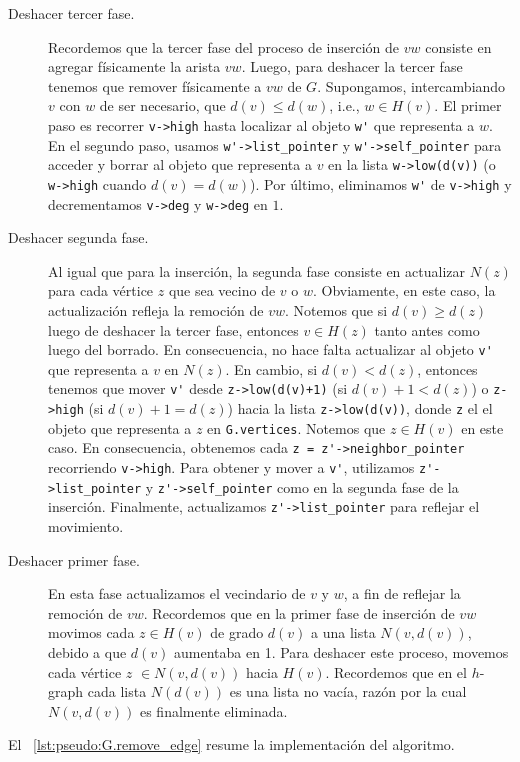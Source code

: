 \documentclass[%
    a4paper,%
    fontsize=12pt,%
    DIV=12,
    twoside,%
    openright,%
    titlepage=true,%
    headsepline,%
    toc=bibliography,%
    parskip=half,%
    cleardoublepage=empty,%
    headings=big,%
]{scrbook}
\makeatletter
\newcommand{\Code}[1]{\lstinline[basicstyle={\ttfamily}]@#1@}
\makeatother
\begin{document}
\begin{description}
\item[Deshacer tercer fase.] Recordemos que la tercer fase del proceso de inserción de $vw$ consiste en agregar físicamente la arista $vw$.  Luego, para deshacer la tercer fase tenemos que remover físicamente a $vw$ de $G$.  Supongamos, intercambiando $v$ con $w$ de ser necesario, que $d(v) \leq d(w)$, i.e., $w \in H(v)$.  El primer paso es recorrer \Code{v->high} hasta localizar al objeto \Code{w'} que representa a $w$.  En el segundo paso, usamos \Code{w'->list_pointer} y \Code{w'->self_pointer} para acceder y borrar al objeto que representa a $v$ en la lista \Code{w->low(d(v))} (o \Code{w->high} cuando $d(v) = d(w)$).  Por último, eliminamos \Code{w'} de \Code{v->high} y decrementamos \Code{v->deg} y \Code{w->deg} en $1$.

\item[Deshacer segunda fase.] Al igual que para la inserción, la segunda fase consiste en actualizar $N(z)$ para cada vértice $z$ que sea vecino de $v$ o $w$.  Obviamente, en este caso, la actualización refleja la remoción de $vw$.  Notemos que si $d(v) \geq d(z)$ luego de deshacer la tercer fase, entonces $v \in H(z)$ tanto antes como luego del borrado.  En consecuencia, no hace falta actualizar al objeto \Code{v'} que representa a $v$ en $N(z)$.  En cambio, si $d(v) < d(z)$, entonces tenemos que mover \Code{v'} desde \Code{z->low(d(v)+1)} (si $d(v)+1 < d(z)$) o \Code{z->high} (si $d(v)+1=d(z)$) hacia la lista \Code{z->low(d(v))}, donde \Code{z} el el objeto que representa a $z$ en \Code{G.vertices}.  Notemos que $z \in H(v)$ en este caso.  En consecuencia, obtenemos cada \Code{z = z'->neighbor_pointer} recorriendo \Code{v->high}.  Para obtener y mover a \Code{v'}, utilizamos \Code{z'->list_pointer} y \Code{z'->self_pointer} como en la segunda fase de la inserción.  Finalmente, actualizamos \Code{z'->list_pointer} para reflejar el movimiento.

\item[Deshacer primer fase.] En esta fase actualizamos el vecindario de $v$ y $w$, a fin de reflejar la remoción de $vw$.  Recordemos que en la primer fase de inserción de $vw$ movimos cada $z \in H(v)$  de grado $d(v)$ a una lista $N(v,d(v))$, debido a que $d(v)$ aumentaba en 1. Para deshacer este proceso, movemos cada vértice $z$ $\in N(v,d(v))$  hacia $H(v)$. Recordemos que en el $h$-graph cada lista $N(d(v))$ es una lista no vacía, razón por la cual $N(v,d(v))$ es finalmente eliminada.
\end{description}
El \lstlistingname~\ref{lst:pseudo:G.remove_edge} resume la implementación del algoritmo.
\end{document}
